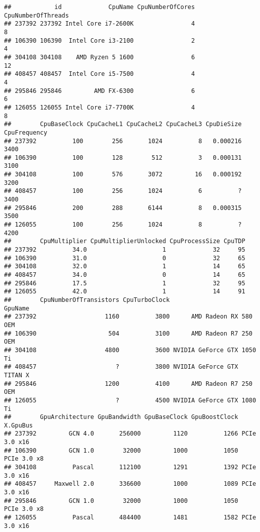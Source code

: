\documentclass[
]{article}
\begin{document}
\begin{verbatim}
##            id             CpuName CpuNumberOfCores CpuNumberOfThreads
## 237392 237392 Intel Core i7-2600K                4                  8
## 106390 106390  Intel Core i3-2100                2                  4
## 304108 304108    AMD Ryzen 5 1600                6                 12
## 408457 408457  Intel Core i5-7500                4                  4
## 295846 295846         AMD FX-6300                6                  6
## 126055 126055 Intel Core i7-7700K                4                  8
##        CpuBaseClock CpuCacheL1 CpuCacheL2 CpuCacheL3 CpuDieSize CpuFrequency
## 237392          100        256       1024          8   0.000216         3400
## 106390          100        128        512          3   0.000131         3100
## 304108          100        576       3072         16   0.000192         3200
## 408457          100        256       1024          6          ?         3400
## 295846          200        288       6144          8   0.000315         3500
## 126055          100        256       1024          8          ?         4200
##        CpuMultiplier CpuMultiplierUnlocked CpuProcessSize CpuTDP
## 237392          34.0                     1             32     95
## 106390          31.0                     0             32     65
## 304108          32.0                     1             14     65
## 408457          34.0                     0             14     65
## 295846          17.5                     1             32     95
## 126055          42.0                     1             14     91
##        CpuNumberOfTransistors CpuTurboClock                    GpuName
## 237392                   1160          3800      AMD Radeon RX 580 OEM
## 106390                    504          3100      AMD Radeon R7 250 OEM
## 304108                   4800          3600 NVIDIA GeForce GTX 1050 Ti
## 408457                      ?          3800 NVIDIA GeForce GTX TITAN X
## 295846                   1200          4100      AMD Radeon R7 250 OEM
## 126055                      ?          4500 NVIDIA GeForce GTX 1080 Ti
##        GpuArchitecture GpuBandwidth GpuBaseClock GpuBoostClock     X.GpuBus
## 237392         GCN 4.0       256000         1120          1266 PCIe 3.0 x16
## 106390         GCN 1.0        32000         1000          1050  PCIe 3.0 x8
## 304108          Pascal       112100         1291          1392 PCIe 3.0 x16
## 408457     Maxwell 2.0       336600         1000          1089 PCIe 3.0 x16
## 295846         GCN 1.0        32000         1000          1050  PCIe 3.0 x8
## 126055          Pascal       484400         1481          1582 PCIe 3.0 x16

\end{verbatim}
\end{document}
